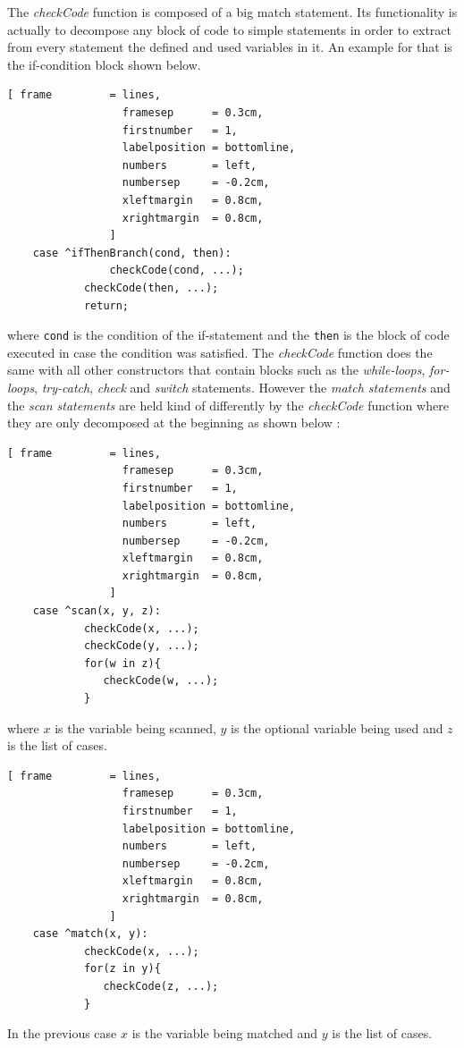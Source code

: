 \documentclass[11pt]{report}
\begin{document}
The \textsl{checkCode} function is composed of a big match statement. Its functionality is actually to decompose any block of code to simple statements in order to extract from every statement the defined and used variables in it. An example for that is the if-condition block shown below.
\begin{Verbatim}[ frame         = lines, 
                  framesep      = 0.3cm, 
                  firstnumber   = 1,
                  labelposition = bottomline,
                  numbers       = left,
                  numbersep     = -0.2cm,
                  xleftmargin   = 0.8cm,
                  xrightmargin  = 0.8cm,
                ]
    case ^ifThenBranch(cond, then): 
        		checkCode(cond, ...);
			checkCode(then, ...);
			return;
\end{Verbatim}
where \texttt{cond} is the condition of the if-statement and the \texttt{then} is the block of code executed in case the condition was satisfied. The \textsl{checkCode} function does the same with all other constructors that contain blocks such as the \textsl{while-loops}, \textsl{for-loops}, \textsl{try-catch}, \textsl{check} and \textsl{switch} statements. However the \textsl{match statements} and the \textsl{scan statements} are held kind of differently by the \textsl{checkCode} function where they are only decomposed at the beginning as shown below :
\begin{Verbatim}[ frame         = lines, 
                  framesep      = 0.3cm, 
                  firstnumber   = 1,
                  labelposition = bottomline,
                  numbers       = left,
                  numbersep     = -0.2cm,
                  xleftmargin   = 0.8cm,
                  xrightmargin  = 0.8cm,
                ]
    case ^scan(x, y, z): 
    		checkCode(x, ...);
    		checkCode(y, ...);
	    	for(w in z){
	       	   checkCode(w, ...);
	    	}
\end{Verbatim}
where $x$ is the variable being scanned, $y$ is the optional variable being used and $z$ is the list of cases.
\begin{Verbatim}[ frame         = lines, 
                  framesep      = 0.3cm, 
                  firstnumber   = 1,
                  labelposition = bottomline,
                  numbers       = left,
                  numbersep     = -0.2cm,
                  xleftmargin   = 0.8cm,
                  xrightmargin  = 0.8cm,
                ]
    case ^match(x, y): 
    		checkCode(x, ...);
	    	for(z in y){
	       	   checkCode(z, ...);
	    	} 
\end{Verbatim}
In the previous case $x$ is the variable being matched and $y$ is the list of cases.
\\
\end{document}
